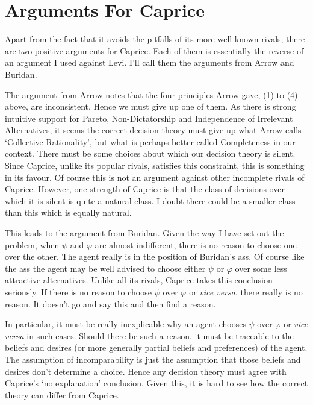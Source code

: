 \hypertarget{arguments-for-caprice}{%
\section{Arguments For Caprice}\label{arguments-for-caprice}}

Apart from the fact that it avoids the pitfalls of its more well-known
rivals, there are two positive arguments for Caprice. Each of them is
essentially the reverse of an argument I used against Levi. I'll call
them the arguments from Arrow and Buridan.

The argument from Arrow notes that the four principles Arrow gave, (1)
to (4) above, are inconsistent. Hence we must give up one of them. As
there is strong intuitive support for Pareto, Non-Dictatorship and
Independence of Irrelevant Alternatives, it seems the correct decision
theory must give up what Arrow calls `Collective Rationality', but what
is perhaps better called Completeness in our context. There must be some
choices about which our decision theory is silent. Since Caprice, unlike
its popular rivals, satisfies this constraint, this is something in its
favour. Of course this is not an argument against other incomplete
rivals of Caprice. However, one strength of Caprice is that the class of
decisions over which it is silent is quite a natural class. I doubt
there could be a smaller class than this which is equally natural.

This leads to the argument from Buridan. Given the way I have set out
the problem, when $\psi$ and $\varphi$ are almost indifferent, there is no reason to
choose one over the other. The agent really is in the position of
Buridan's ass. Of course like the ass the agent may be well advised to
choose either $\psi$ or $\varphi$ over some less attractive alternatives. Unlike all
its rivals, Caprice takes this conclusion seriously. If there is no
reason to choose $\psi$ over $\varphi$ or \emph{vice versa}, there really is no
reason. It doesn't go and say this and then find a reason.

In particular, it must be really inexplicable why an agent chooses $\psi$
over $\varphi$ or \emph{vice versa} in such cases. Should there be such a
reason, it must be traceable to the beliefs and desires (or more
generally partial beliefs and preferences) of the agent. The assumption
of incomparability is just the assumption that those beliefs and desires
don't determine a choice. Hence any decision theory must agree with
Caprice's `no explanation' conclusion. Given this, it is hard to see how
the correct theory can differ from Caprice.

